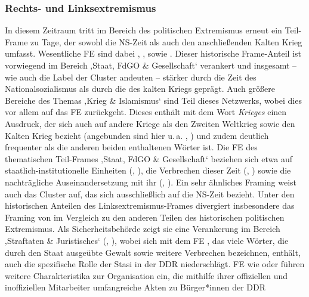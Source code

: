 \subsubsection{Rechts- und Linksextremismus}\label{rechts--und-linksextremismus-3}

In diesem Zeitraum tritt im Bereich des politischen Extremismus erneut ein Teil-Frame zu Tage, der sowohl die NS-Zeit als auch den anschließenden Kalten Krieg umfasst. Wesentliche FE sind dabei , ,  sowie . Dieser historische Frame-Anteil ist vorwiegend im Bereich ‚Staat, FdGO \& Gesellschaft` verankert und insgesamt -- wie auch die Label der Cluster andeuten -- stärker durch die Zeit des Nationalsozialismus als durch die des kalten Kriegs geprägt. Auch größere Bereiche des Themas ‚Krieg \& Islamismus` sind Teil dieses Netzwerks, wobei dies vor allem auf das FE  zurückgeht. Dieses enthält mit dem Wort \emph{Krieges} einen Ausdruck, der sich auch auf andere Kriege als den Zweiten Weltkrieg sowie den Kalten Krieg bezieht (angebunden sind hier u.\,a. , ) und zudem deutlich frequenter als die anderen beiden enthaltenen Wörter ist. Die FE des thematischen Teil-Frames ‚Staat, FdGO \& Gesellschaft` beziehen sich etwa auf staatlich-institutionelle Einheiten (, ), die Verbrechen dieser Zeit (, ) sowie die nachträgliche Auseinandersetzung mit ihr (, ). Ein sehr ähnliches Framing weist auch das Cluster  auf, das sich ausschließlich auf die NS-Zeit bezieht. Unter den historischen Anteilen des Linksextremismus-Frames divergiert insbesondere das Framing von  im Vergleich zu den anderen Teilen des historischen politischen Extremismus. Als Sicherheitsbehörde zeigt sie eine Verankerung im Bereich ‚Straftaten \& Juristisches` (, ), wobei sich mit dem FE , das viele Wörter, die durch den Staat ausgeübte Gewalt sowie weitere Verbrechen bezeichnen, enthält, auch die spezifische Rolle der Stasi in der DDR niederschlägt. FE wie  oder  führen weitere Charakteristika zur Organisation ein, die mithilfe ihrer offiziellen und inoffiziellen Mitarbeiter umfangreiche Akten zu Bürger*innen der DDR 
